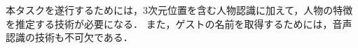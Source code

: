 \documentclass[a4j]{jarticle}
\begin{document}
本タスクを遂行するためには，3次元位置を含む人物認識に加えて，人物の特徴を推定する技術が必要になる．
また，ゲストの名前を取得するためには，音声認識の技術も不可欠である．
\end{document}
